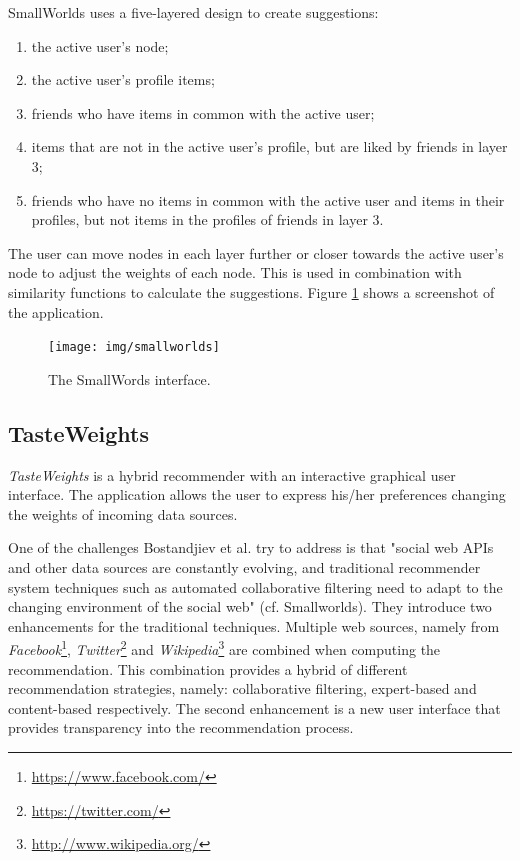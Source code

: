 SmallWorlds uses a five-layered design to create suggestions:

\begin{enumerate}
	\item the active user's node;
	\item the active user's profile items;
	\item friends who have items in common with the active user;
	\item items that are not in the active user’s profile, but are liked by friends in layer $3$;
	\item friends who have no items in common with the active user and items in their profiles, but not items in the profiles of friends in layer $3$.
\end{enumerate}

The user can move nodes in each layer further or closer towards the active user's node to adjust the weights of each node. This is used in combination with similarity functions to calculate the suggestions. Figure \ref{figure:smallworlds} shows a screenshot of the application.

\begin{figure}%
	\begin{center}
		\texttt{[image: img/smallworlds]}%
	\end{center}
	\caption{The SmallWords interface.}%
	\label{figure:smallworlds}%
\end{figure}



\subsection{TasteWeights}\label{chapter:survey:section:applications:subsection:tasteweights}

\emph{TasteWeights} is a hybrid recommender with an interactive graphical user interface\cite{bostandjiev:2012}. The application allows the user to express his/her preferences changing the weights of incoming data sources.

One of the challenges Bostandjiev et al. try to address is that "social web APIs and other data sources are constantly evolving, and traditional recommender system techniques such as automated collaborative filtering need to adapt to the changing environment of the social web"\cite{bostandjiev:2012} (cf. Smallworlds). They introduce two enhancements for the traditional techniques. Multiple web sources, namely from \emph{Facebook}\footnote{\url{https://www.facebook.com/}}, \emph{Twitter}\footnote{\url{https://twitter.com/}} and \emph{Wikipedia}\footnote{\url{http://www.wikipedia.org/}} are combined when computing the recommendation. This combination provides a hybrid of different recommendation strategies, namely: collaborative filtering, expert-based and content-based respectively. The second enhancement is a new user interface that provides transparency into the recommendation process.


